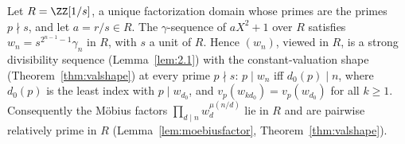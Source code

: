 \begin{lemma}
  \label{lem:gamma-away}
  \leanok
  Let $R = \ZZ[1/s]$, a unique factorization domain whose primes are the primes $p \nmid s$, and
  let $a = r/s \in R$. The $\gamma$-sequence of $aX^2 + 1$ over $R$ satisfies
  $w_n = s^{2^{n-1}-1}\gamma_n$ in $R$, with $s$ a unit of $R$. Hence $(w_n)$, viewed in $R$, is
  a strong divisibility sequence (Lemma~\ref{lem:2.1}) with the constant-valuation shape
  (Theorem~\ref{thm:valshape}) at every prime $p \nmid s$: $p \mid w_n$ iff $d_0(p) \mid n$, where
  $d_0(p)$ is the least index with $p \mid w_{d_0}$, and $v_p(w_{kd_0}) = v_p(w_{d_0})$ for all
  $k \ge 1$. Consequently the Möbius factors $\prod_{d \mid n} w_d^{\mu(n/d)}$ lie in $R$ and are
  pairwise relatively prime in $R$ (Lemma~\ref{lem:moebiusfactor}, Theorem~\ref{thm:valshape}).
\end{lemma}

